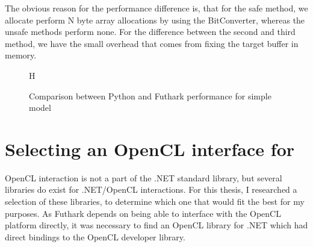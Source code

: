 The obvious reason for the performance difference is, that for the safe
method, we allocate perform N byte array allocations by using the BitConverter,
whereas the unsafe methods perform none.
For the difference between the second and third method, we have the small
overhead that comes from fixing the target buffer in memory.
\begin{figure}{H}
    \caption{Comparison between Python and Futhark performance for simple model}
    \label{fig:shortperformancegraph}
\end{figure}

\clearpage

\section{Selecting an OpenCL interface for \csharp{}}
OpenCL interaction is not a part of the .NET standard library, but several
libraries do exist for .NET/OpenCL interactions. For this thesis, I researched a
selection of these libraries, to determine which one that would fit the best for
my purposes.
As Futhark depends on being able to interface with the OpenCL platform directly,
it was necessary to find an OpenCL library for .NET which had direct bindings to
the OpenCL developer library.


